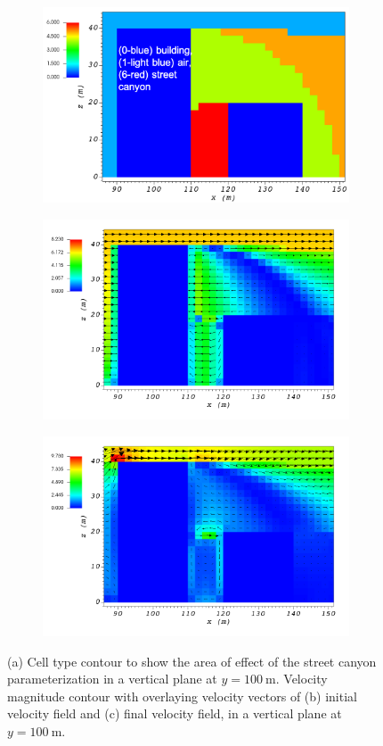 \begin{figure}[H]
    \centering
    \begin{subfigure}{\textwidth}
    \centering
    \includegraphics[width=10.3cm,keepaspectratio]{Images/street_y_100_1_init_icell.png}
    \caption{}
    \end{subfigure}
    \begin{subfigure}{\textwidth}
    \centering
    \includegraphics[width=11.0cm,keepaspectratio]{Images/street_y_100_1_init_vel.png}
    \caption{}
    \end{subfigure}
    \begin{subfigure}{\textwidth}
    \centering
    \includegraphics[width=11.0cm,keepaspectratio]{Images/street_y_100_1_final.png}
    \caption{}
    \end{subfigure}
    \caption{(a) Cell type contour to show the area of effect of the street canyon parameterization in a vertical plane at $y=100\ \si{\meter}$. Velocity magnitude contour with overlaying velocity vectors of (b) initial velocity field and (c) final velocity field, in a vertical plane at $y=100\ \si{\meter}$.}
\end{figure}

